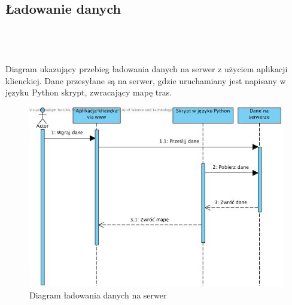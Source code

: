 \subsection{Ładowanie danych}\\\\
\\Diagram ukazujący przebieg ładowania danych na serwer z użyciem aplikacji klienckiej. Dane przesyłane są na serwer, gdzie uruchamiany jest napisany w języku Python skrypt, zwracający mapę tras.
\begin{center}
\begin{figure}[H]
\centering
\includegraphics[scale=0.8]{imgs/S2.jpg}
\caption{Diagram ładowania danych na serwer}
\label{fig:tasks_list}
\end{figure}
\end{center}
\newpage
